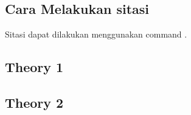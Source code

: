 \subsection{Cara Melakukan sitasi}{
    Sitasi dapat dilakukan menggunakan command \cite{han_heo_park_kee_sunwoo_2016}.
    \lipsum[2]
}

\subsection{Theory 1}{
    \lipsum[6-8]
}

\subsection{Theory 2}{
    \lipsum[6-8]
}